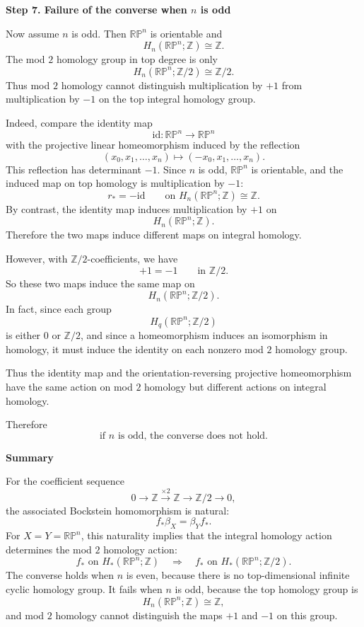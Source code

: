 \begin{solution}
\medskip
\noindent\textbf{Step 7. Failure of the converse when \(n\) is odd}\par
\smallskip


Now assume \(n\) is odd. Then \(\mathbb{RP}^n\) is orientable and
\[
H_n(\mathbb{RP}^n;\mathbb Z)\cong \mathbb Z.
\]
The mod \(2\) homology group in top degree is only
\[
H_n(\mathbb{RP}^n;\mathbb Z/2)\cong \mathbb Z/2.
\]
Thus mod \(2\) homology cannot distinguish multiplication by \(+1\) from multiplication by \(-1\) on the top integral homology group.

Indeed, compare the identity map
\[
\mathrm{id}:\mathbb{RP}^n\longrightarrow \mathbb{RP}^n
\]
with the projective linear homeomorphism induced by the reflection
\[
(x_0,x_1,\dots,x_n)\longmapsto (-x_0,x_1,\dots,x_n).
\]
This reflection has determinant \(-1\). Since \(n\) is odd, \(\mathbb{RP}^n\) is orientable, and the induced map on top homology is multiplication by \(-1\):
\[
r_*=-\mathrm{id}
\qquad
\text{on }
H_n(\mathbb{RP}^n;\mathbb Z)\cong \mathbb Z.
\]
By contrast, the identity map induces multiplication by \(+1\) on
\[
H_n(\mathbb{RP}^n;\mathbb Z).
\]
Therefore the two maps induce different maps on integral homology.

However, with \(\mathbb Z/2\)-coefficients, we have
\[
+1=-1
\qquad
\text{in }
\mathbb Z/2.
\]
So these two maps induce the same map on
\[
H_n(\mathbb{RP}^n;\mathbb Z/2).
\]
In fact, since each group
\[
H_q(\mathbb{RP}^n;\mathbb Z/2)
\]
is either \(0\) or \(\mathbb Z/2\), and since a homeomorphism induces an isomorphism in homology, it must induce the identity on each nonzero mod \(2\) homology group.

Thus the identity map and the orientation-reversing projective homeomorphism have the same action on mod \(2\) homology but different actions on integral homology.

Therefore
\[
\boxed{
	\text{if }n\text{ is odd, the converse does not hold.}
}
\]


\medskip
\noindent\textbf{Summary}\par
\smallskip


For the coefficient sequence
\[
0\longrightarrow \mathbb Z
\xrightarrow{\times 2}
\mathbb Z
\longrightarrow
\mathbb Z/2
\longrightarrow 0,
\]
the associated Bockstein homomorphism is natural:
\[
\boxed{
	f_*\beta_X=\beta_Y f_*.
}
\]
For \(X=Y=\mathbb{RP}^n\), this naturality implies that the integral homology action determines the mod \(2\) homology action:
\[
\boxed{
	f_* \text{ on } H_*(\mathbb{RP}^n;\mathbb Z)
	\quad\Longrightarrow\quad
	f_* \text{ on } H_*(\mathbb{RP}^n;\mathbb Z/2).
}
\]
The converse holds when \(n\) is even, because there is no top-dimensional infinite cyclic homology group. It fails when \(n\) is odd, because the top homology group is
\[
H_n(\mathbb{RP}^n;\mathbb Z)\cong \mathbb Z,
\]
and mod \(2\) homology cannot distinguish the maps \(+1\) and \(-1\) on this group.
\end{solution}


